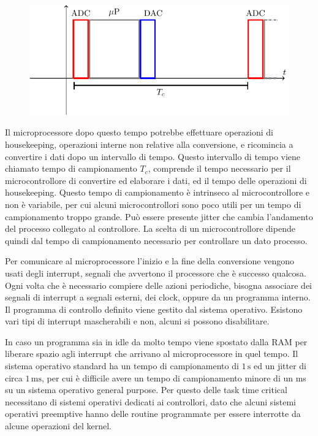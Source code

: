 \documentclass{article}
\numberwithin{equation}{subsection}
\begin{document}
\begin{figure}[H]%
    \centering
    \includegraphics{tempo-campionamento.pdf}%
\end{figure}

Il microprocessore dopo questo tempo potrebbe effettuare operazioni di housekeeping, operazioni interne non relative alla conversione, e ricomincia a convertire i dati dopo un intervallo di tempo. 
Questo intervallo di tempo viene chiamato tempo di campionamento $T_c$, comprende il tempo necessario per il microcontrollore di convertire ed elaborare i dati, ed il tempo 
delle operazioni di housekeeping. Questo tempo di campionamento è intrinseco al microcontrollore e non è variabile, per cui alcuni microcontrollori sono poco utili per 
un tempo di campionamento troppo grande. Può essere presente jitter che cambia l'andamento del processo collegato al controllore. La scelta di un microcontrollore dipende 
quindi dal tempo di campionamento necessario per controllare un dato processo. 


Per comunicare al microprocessore l'inizio e la fine della conversione vengono usati degli interrupt, segnali che avvertono il processore che è successo qualcosa. Ogni 
volta che è necessario compiere delle azioni periodiche, bisogna associare dei segnali di interrupt a segnali esterni, dei clock, oppure da un programma interno. Il programma 
di controllo definito viene gestito dal sistema operativo. Esistono vari tipi di interrupt mascherabili e non, alcuni si possono disabilitare. 


In caso un programma 
sia in idle da molto tempo viene spostato dalla RAM per liberare spazio agli interrupt che arrivano al microprocessore in quel tempo. Il sistema operativo standard ha un 
tempo di campionamento di $1\,\mathrm{s}$ ed un jitter di circa $1\,\mathrm{ms}$, per cui è difficile avere un tempo di campionamento minore di un ms su un sistema operativo general purpose. Per questo 
delle task time critical necessitano di sistemi operativi dedicati ai controllori, dato che alcuni sistemi operativi preemptive hanno delle routine programmate per essere 
interrotte da alcune operazioni del kernel. 
\end{document}
